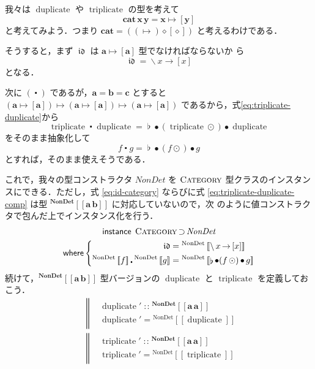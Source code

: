 \documentclass[a5paper,twoside,fleqn,draft]{jsbook}
\def\[{\left[\!\left[}
\def\]{\right]\!\right]}
\newcommand{\mBrace}{\Vert}
\newcommand{\mKeyword}[1]{\mathsf{#1}} %
\newcommand{\mInstanceKeyword}{\mKeyword{instance}}
\newcommand{\mWhereKeyword}{\mKeyword{where}}
\DeclareMathOperator{\mInstance}{\mInstanceKeyword}
\DeclareMathOperator{\mSuperSet}{\supset}
\DeclareMathOperator{\mWhere}{\mWhereKeyword}
\newcommand{\mAnonParam}{\diamond}
\newcommand{\mSpecialFunc}[1]{\mathrm{#1}}
\DeclareMathOperator{\mDuplicate}{\mSpecialFunc{duplicate}}
\DeclareMathOperator{\mTriplicate}{\mSpecialFunc{triplicate}}
\DeclareMathOperator{\mIdCat}{\mathfrak{id}}
\DeclareMathOperator{\mComp}{\bullet} %
\DeclareMathOperator{\mCompCat}{\centerdot}
\DeclareMathOperator{\mConcat}{\flat}
\DeclareMathOperator{\mIn}{{:\!:}}
\DeclareMathOperator{\mLambda}{\backslash}
\DeclareMathOperator{\mLambdaArrow}{\rightarrow}
\DeclareMathOperator{\mMapList}{\odot}
\DeclareMathOperator{\mMapsTo}{\mapsto}
\newcommand{\mType}[1]{\mathbf{#1}}
\newcommand{\mA}{\mType{a}}
\newcommand{\mB}{\mType{b}}
\newcommand{\mC}{\mType{c}}
\newcommand{\mGenericTypeAssemble}[2]{{}^{\mType{#1}}\[\mType{#2}\]}
\newcommand{\mTypeConstructor}[1]{\textit{#1}}
\newcommand{\mValueConstructor}[1]{\mathrm{#1}}
\newcommand{\mGenericValueAssemble}[2]{{}^\mValueConstructor{#1}\[#2\]}
\newcommand{\mGenericTypeClass}[1]{\textsc{#1}} %
\newcommand{\mCategoryTypeClass}{\mGenericTypeClass{Category}}
\newcommand{\mLambdaExp}[2]{\mLambda{#1}\mLambdaArrow{#2}}
\begin{document}
我々は $\mDuplicate$ や $\mTriplicate$ の型を考えて
\begin{equation}
  \mType{cat}\,\mType{x}\,\mType{y}=\mType{x}\mMapsTo[\mType{y}]
\end{equation}
と考えてみよう．つまり
$\mType{cat}=((\mMapsTo)\mAnonParam[\mAnonParam])$ と考えるわけである．

そうすると，まず $\mIdCat$ は $\mA\mMapsTo[\mA]$ 型でなければならないか
ら
\begin{equation}
  \label{eq:id-category}
  \mIdCat=\mLambda x\mLambdaArrow[x]
\end{equation}
となる．

次に $(\mCompCat)$ であるが，$\mA=\mB=\mC$ とすると
$(\mA\mMapsTo[\mA])\mMapsTo(\mA\mMapsTo[\mA])\mMapsTo(\mA\mMapsTo[\mA])$
であるから，式\eqref{eq:triplicate-duplicate}から
\begin{equation}
  \mTriplicate\mCompCat\mDuplicate
  =\mConcat\mComp(\mTriplicate\mMapList)\mComp\mDuplicate
\end{equation}
をそのまま抽象化して
\begin{equation}
  \label{eq:triplicate-duplicate-comp}
  f\mCompCat g=\mConcat\mComp(f\mMapList)\mComp g
\end{equation}
とすれば，そのまま使えそうである．

これで，我々の型コンストラクタ $\mTypeConstructor{NonDet}$ を
$\mCategoryTypeClass$ 型クラスのインスタンスにできる．ただし，式
\eqref{eq:id-category} ならびに式 \eqref{eq:triplicate-duplicate-comp}
は型 $\mGenericTypeAssemble{NonDet}{\mA\,\mB}$ に対応していないので，次
のように値コンストラクタで包んだ上でインスタンス化を行う．
\begin{multline}
  \label{eq:nondet-instance}
  \mInstance\;
  \mGenericTypeClass{Category}\mSuperSet\mTypeConstructor{NonDet}\\
  \mWhere\left\{
  \begin{aligned}
    \mIdCat
    &=\mGenericValueAssemble{NonDet}{\mLambdaExp{x}{[x]}}\\
    \mGenericValueAssemble{NonDet}{f}\mCompCat\mGenericValueAssemble{NonDet}{g}
    &=\mGenericValueAssemble{NonDet}{\mConcat\mComp(f\mMapList)\mComp g}
  \end{aligned}
  \right.
\end{multline}
続けて，$\mGenericTypeAssemble{NonDet}{\mA\,\mB}$ 型バージョンの
$\mDuplicate$ と $\mTriplicate$ を定義しておこう．
\begin{align}
  &\left\mBrace
  \begin{aligned}
    &\mDuplicate'
    \mIn\mGenericTypeAssemble{NonDet}{\mA\,\mA}\\
    &\mDuplicate'
    =\mGenericValueAssemble{NonDet}{\mDuplicate}
  \end{aligned}
  \right.\\
  &\left\mBrace
  \begin{aligned}
    &\mTriplicate'
    \mIn\mGenericTypeAssemble{NonDet}{\mA\,\mA}\\
    &\mTriplicate'
    =\mGenericValueAssemble{NonDet}{\mTriplicate}
  \end{aligned}
  \right.
\end{align}
\end{document}

